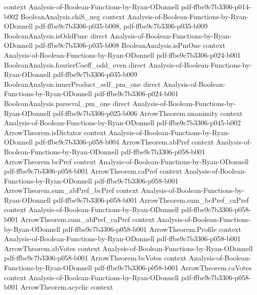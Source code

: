 \begin{theorem}
  {context}
  {Analysis-of-Boolean-Functions-by-Ryan-ODonnell}
  {pdf-ffbe9c7b3306-p014-b002}
\proofstep
  {BooleanAnalysis.chiS_neg}
  {context}
  {Analysis-of-Boolean-Functions-by-Ryan-ODonnell}
  {pdf-ffbe9c7b3306-p035-b008,
    pdf-ffbe9c7b3306-p035-b009}
\proofstep
  {BooleanAnalysis.isOddFunc}
  {direct}
  {Analysis-of-Boolean-Functions-by-Ryan-ODonnell}
  {pdf-ffbe9c7b3306-p035-b008}
\proofstep
  {BooleanAnalysis.isPmOne}
  {context}
  {Analysis-of-Boolean-Functions-by-Ryan-ODonnell}
  {pdf-ffbe9c7b3306-p024-b001}
\proofstep
  {BooleanAnalysis.fourierCoeff_odd_even}
  {direct}
  {Analysis-of-Boolean-Functions-by-Ryan-ODonnell}
  {pdf-ffbe9c7b3306-p035-b009}
\proofstep
  {BooleanAnalysis.innerProduct_self_pm_one}
  {direct}
  {Analysis-of-Boolean-Functions-by-Ryan-ODonnell}
  {pdf-ffbe9c7b3306-p024-b001}
\proofstep
  {BooleanAnalysis.parseval_pm_one}
  {direct}
  {Analysis-of-Boolean-Functions-by-Ryan-ODonnell}
  {pdf-ffbe9c7b3306-p025-b006}
\proofstep
  {ArrowTheorem.unanimity}
  {context}
  {Analysis-of-Boolean-Functions-by-Ryan-ODonnell}
  {pdf-ffbe9c7b3306-p045-b002}
\proofstep
  {ArrowTheorem.isDictator}
  {context}
  {Analysis-of-Boolean-Functions-by-Ryan-ODonnell}
  {pdf-ffbe9c7b3306-p058-b004}
\proofstep
  {ArrowTheorem.abPref}
  {context}
  {Analysis-of-Boolean-Functions-by-Ryan-ODonnell}
  {pdf-ffbe9c7b3306-p058-b001}
\proofstep
  {ArrowTheorem.bcPref}
  {context}
  {Analysis-of-Boolean-Functions-by-Ryan-ODonnell}
  {pdf-ffbe9c7b3306-p058-b001}
\proofstep
  {ArrowTheorem.caPref}
  {context}
  {Analysis-of-Boolean-Functions-by-Ryan-ODonnell}
  {pdf-ffbe9c7b3306-p058-b001}
\proofstep
  {ArrowTheorem.sum_abPref_bcPref}
  {context}
  {Analysis-of-Boolean-Functions-by-Ryan-ODonnell}
  {pdf-ffbe9c7b3306-p058-b001}
\proofstep
  {ArrowTheorem.sum_bcPref_caPref}
  {context}
  {Analysis-of-Boolean-Functions-by-Ryan-ODonnell}
  {pdf-ffbe9c7b3306-p058-b001}
\proofstep
  {ArrowTheorem.sum_abPref_caPref}
  {context}
  {Analysis-of-Boolean-Functions-by-Ryan-ODonnell}
  {pdf-ffbe9c7b3306-p058-b001}
\proofstep
  {ArrowTheorem.Profile}
  {context}
  {Analysis-of-Boolean-Functions-by-Ryan-ODonnell}
  {pdf-ffbe9c7b3306-p058-b001}
\proofstep
  {ArrowTheorem.abVotes}
  {context}
  {Analysis-of-Boolean-Functions-by-Ryan-ODonnell}
  {pdf-ffbe9c7b3306-p058-b001}
\proofstep
  {ArrowTheorem.bcVotes}
  {context}
  {Analysis-of-Boolean-Functions-by-Ryan-ODonnell}
  {pdf-ffbe9c7b3306-p058-b001}
\proofstep
  {ArrowTheorem.caVotes}
  {context}
  {Analysis-of-Boolean-Functions-by-Ryan-ODonnell}
  {pdf-ffbe9c7b3306-p058-b001}
\proofstep
  {ArrowTheorem.acyclic}
  {context}

\end{theorem}
